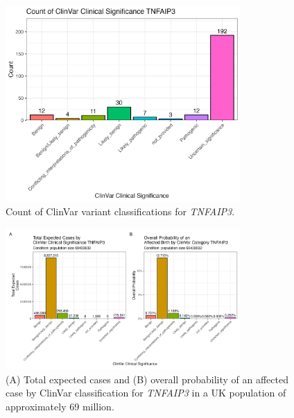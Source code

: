 \documentclass[a4paper,12pt]{article}
\begin{document}
\begin{figure}[H]
  \centering
  \includegraphics[width=0.8\textwidth]{../images/tnfaip3_clinvar_count.png}
  \caption{Count of ClinVar variant classifications for \textit{TNFAIP3}.}
  \label{fig:tnfaip3_clinvar_count}
\end{figure}

\begin{figure}[H]
  \centering
  \includegraphics[width=0.8\textwidth]{../images/tnfaip3_combined_bar_charts.png}
  \caption{(A) Total expected cases and (B) overall probability of an affected case by ClinVar classification for \textit{TNFAIP3} in a UK population of approximately 69 million.}
  \label{fig:tnfaip3_combined_bar_charts}
\end{figure}
\end{document}
